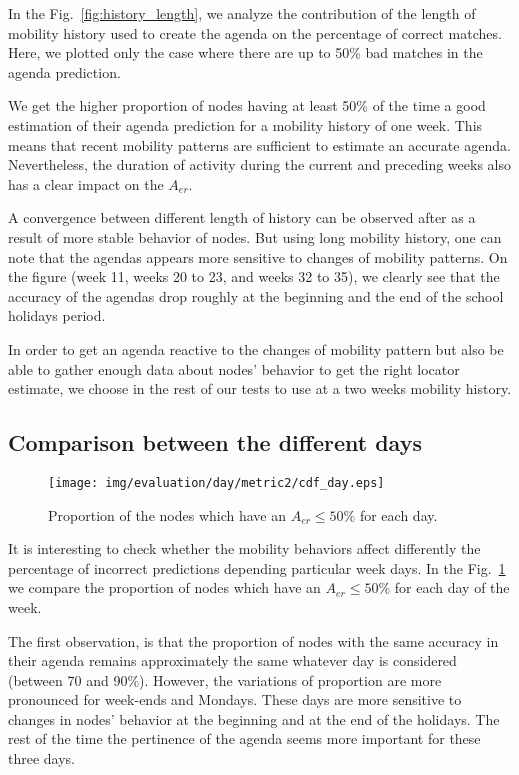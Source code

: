 \documentclass[a4paper]{sig-alternate-10pt}
\begin{document}
In the Fig.~\ref{fig:history_length}, we analyze the contribution of
the length of mobility history used to create the agenda on the
percentage of correct matches. Here, we plotted only the case where
there are up to 50\% bad matches in the agenda prediction.

We get the higher proportion of nodes having at least 50\% of the
time a good estimation of their agenda prediction  for a mobility
history of one week. This means that recent mobility patterns are
sufficient to estimate an accurate agenda. Nevertheless, the
duration  of activity during the current and preceding weeks also
has a clear impact on the $A_{er}$.

A convergence between different length of history can be observed
after as a result of more stable behavior of nodes. But using long
mobility history, one can note that the agendas appears more
sensitive to changes of mobility patterns. On the figure (week 11,
weeks 20 to 23, and weeks 32 to 35), we clearly see that the
accuracy  of the agendas drop roughly at the beginning and the end
of the  school holidays period.

In order to get an agenda reactive to the changes of mobility
pattern  but also be able to gather enough data about nodes'
behavior to get  the right locator estimate, we choose in the rest
of our tests to use  at a two weeks mobility history.

\subsection{Comparison between the different days}
\begin{figure}
\texttt{[image: img/evaluation/day/metric2/cdf\_day.eps]}
\caption{Proportion of the nodes which have an $A_{er}\leq 50\%$ for
each day.} \label{fig:compare_days}
\end{figure}

It is interesting to check whether  the mobility behaviors affect
differently the percentage of incorrect predictions depending
particular week days. In the Fig.~\ref{fig:compare_days} we compare
the proportion of nodes which have an $A_{er}\leq50\%$ for
each day of the week.

The first observation, is that the proportion of nodes with
the  same accuracy in their agenda remains approximately the same
whatever day is considered (between 70  and 90\%). However, the
variations of proportion are more pronounced  for week-ends and
Mondays. These days are more sensitive to changes in nodes' behavior
at the beginning and at the  end of the holidays. The rest of the
time the pertinence of the agenda seems more  important for these
three days.
\end{document}
